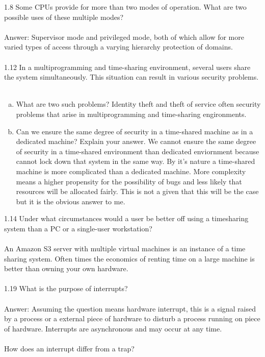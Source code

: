 \documentclass[12pt]{article}
\begin{document}
1.8 Some CPUs provide for more than two modes of operation. What are two
possible uses of these multiple modes?\\\\
Answer: Supervisor mode and privileged mode, both of which allow for more varied 
types of access through a varying hierarchy protection of domains.\\\\
1.12 In a multiprogramming and time-sharing environment, several users
share the system simultaneously. This situation can result in various
security problems.\\\\
\begin{enumerate}[a)]
    \item What are two such problems? Identity theft and theft of service 
    often security problems that arise in multiprogramming and time-sharing 
    engironments. 
    \item Can we ensure the same degree of security in a time-shared 
    machine as in a dedicated machine? Explain your answer. We cannot 
    ensure the same degree of security in a time-shared environment than 
    dedicated enviornment because cannot lock down that system in the same
    way. By it's nature a time-shared machine is more complicated than 
    a dedicated machine. More complexity means a higher propensity for 
    the possibility of bugs and less likely that resources will be allocated 
    fairly. This is not a given that this will be the case but it is the obvious 
    answer to me.
\end{enumerate}
1.14 Under what circumstances would a user be better off using a timesharing
system than a PC or a single-user workstation?\\\\
An Amazon S3 server with multiple virtual machines is an instance of a 
time sharing system. Often times the economics of renting time on a 
large machine is better than owning your own hardware.\\\\
1.19 What is the purpose of interrupts? \\\\
Answer: Assuming the question means hardware interrupt, this is a signal raised 
by a process or a external piece of hardware to disturb a process running on 
piece of hardware. Interrupts are asynchronous and may occur at any time.\\\\
How does an interrupt differ from a trap? \\\\
\end{document}
